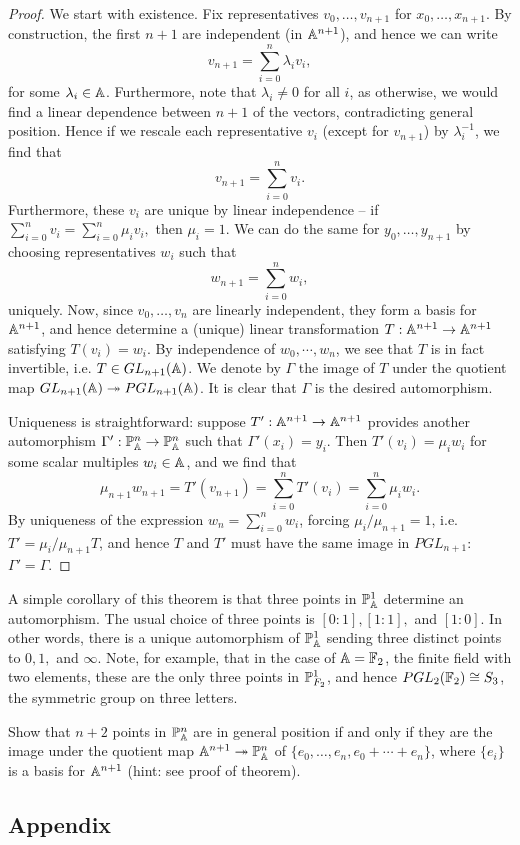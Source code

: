\documentclass{../../mathnotes}
\begin{document}
\begin{proof}
    We start with existence.
    Fix representatives $v_0,\ldots,v_{n+1}$ for $x_0,\ldots,x_{n+1}$. By construction, the first $n+1$ are independent (in $\mathbb{A}^{n+1}$),
    and hence we can write
    \[v_{n+1}=\sum_{i=0}^{n}\lambda_i v_i,\]
    for some $\lambda_i\in\mathbb{A}$. Furthermore, note that $\lambda_i\neq0$ for all $i$, as otherwise, we would find a linear dependence between
    $n+1$ of the vectors, contradicting general position. Hence if we rescale each representative $v_i$ (except for $v_{n+1}$) by $\lambda_i^{-1}$,
    we find that
    \[v_{n+1}=\sum_{i=0}^nv_i.\]
    Furthermore, these $v_i$ are unique by linear independence -- if $\sum_{i=0}^nv_i=\sum_{i=0}^n\mu_i v_i,$ then $\mu_i=1$.
    We can do the same for $y_0,\ldots,y_{n+1}$ by choosing representatives $w_i$ such that
    \[w_{n+1}=\sum_{i=0}^nw_i,\]
    uniquely.
    Now, since $v_0,\ldots, v_n$ are linearly independent, they form a basis for $\mathbb{A}^{n+1}$, and hence
    determine a (unique) linear transformation $T:\mathbb{A}^{n+1}\to\mathbb{A}^{n+1}$ satisfying $T(v_i)=w_i$. By independence
    of $w_0,\cdots, w_n$, we see that $T$ is in fact invertible, i.e. $T\in GL_{n+1}(\mathbb{A})$.
    We denote by $\Gamma$ the image of $T$ under the quotient map $GL_{n+1}(\mathbb{A})\twoheadrightarrow PGL_{n+1}(\mathbb{A})$.
    It is clear that $\Gamma$ is the desired automorphism.

    Uniqueness is straightforward: suppose $T':\mathbb{A}^{n+1}\to\mathbb{A}^{n+1}$ provides another automorphism $\Gamma':\mathbb{P}^n_{\mathbb{A}}\to\mathbb{P}^n_{\mathbb{A}}$
    such that $\Gamma'(x_i)=y_i$. Then $T'(v_i)=\mu_iw_i$ for some scalar multiples $w_i\in\mathbb{A}$, and we find that
    \[\mu_{n+1}w_{n+1}=T'(v_{n+1})=\sum_{i=0}^nT'(v_i)=\sum_{i=0}^n\mu_iw_i.\]
    By uniqueness of the expression $w_n=\sum_{i=0}^nw_i$, forcing $\mu_i/\mu_{n+1}=1$, i.e. $T'=\mu_i/\mu_{n+1}T$,
    and hence $T$ and $T'$ must have the same image in $PGL_{n+1}$: $\Gamma'=\Gamma$.
\end{proof}

\begin{rem}
    A simple corollary of this theorem is that three points in $\mathbb{P}^1_{\mathbb{A}}$ determine an automorphism. The usual choice of three points is $[0:1],[1:1],$ and $[1:0]$.
    In other words, there is a unique automorphism of $\mathbb{P}^1_{\mathbb{A}}$ sending three distinct points to $0,1,$ and $\infty$. Note, for example, that in the case of $\mathbb{A}=\mathbb{F}_2$,
    the finite field with two elements, these are the only three points in $\mathbb{P}^1_{F_2}$, and hence $PGL_{2}(\mathbb{F}_2)\cong S_3$, the symmetric group on three letters.
\end{rem}

\begin{exc}
    Show that $n+2$ points in $\mathbb{P}^n_{\mathbb{A}}$ are in general position if and only if they are the image under the quotient
    map $\mathbb{A}^{n+1}\twoheadrightarrow\mathbb{P}^n_{\mathbb{A}}$ of $\{e_0,\ldots,e_n,e_0+\cdots+e_n\}$, where $\{e_i\}$ is a basis for $\mathbb{A}^{n+1}$
    (hint: see proof of theorem).
\end{exc}



\subsection*{Appendix}
\end{document}
